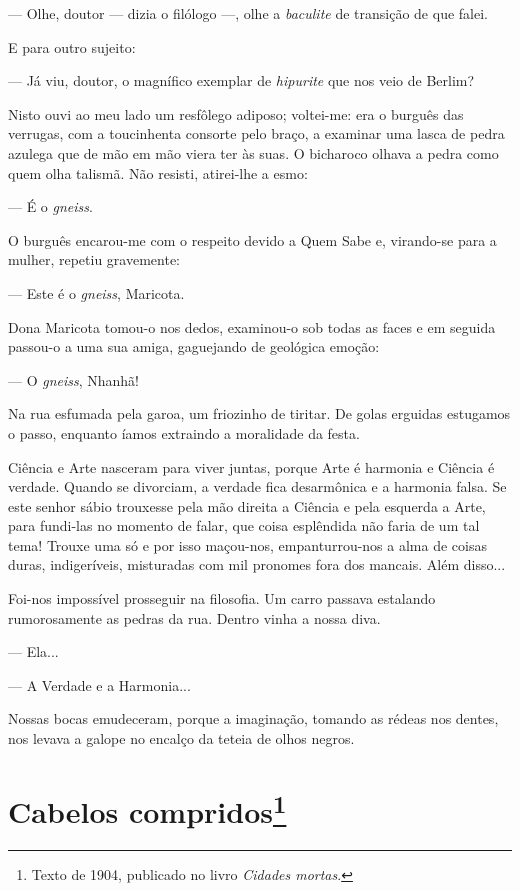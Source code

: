 --- Olhe, doutor --- dizia o filólogo ---, olhe a \emph{baculite} de
transição de que falei.

E para outro sujeito:

--- Já viu, doutor, o magnífico exemplar de \emph{hipurite} que nos veio
de Berlim?

Nisto ouvi ao meu lado um resfôlego adiposo; voltei-me: era o burguês
das verrugas, com a toucinhenta consorte pelo braço, a examinar uma
lasca de pedra azulega que de mão em mão viera ter às suas. O bicharoco
olhava a pedra como quem olha talismã. Não resisti, atirei-lhe a esmo:

--- É o \emph{gneiss}.

O burguês encarou-me com o respeito devido a Quem Sabe e, virando-se
para a mulher, repetiu gravemente:

--- Este é o \emph{gneiss}, Maricota.

Dona Maricota tomou-o nos dedos, examinou-o sob todas as faces e em
seguida passou-o a uma sua amiga, gaguejando de geológica emoção:

--- O \emph{gneiss}, Nhanhã!

Na rua esfumada pela garoa, um friozinho de tiritar. De golas erguidas
estugamos o passo, enquanto íamos extraindo a moralidade da festa.

Ciência e Arte nasceram para viver juntas, porque Arte é harmonia e
Ciência é verdade. Quando se divorciam, a verdade fica desarmônica e a
harmonia falsa. Se este senhor sábio trouxesse pela mão direita a
Ciência e pela esquerda a Arte, para fundi-las no momento de falar, que
coisa esplêndida não faria de um tal tema! Trouxe uma só e por isso
maçou-nos, empanturrou-nos a alma de coisas duras, indigeríveis,
misturadas com mil pronomes fora dos mancais. Além disso...

Foi-nos impossível prosseguir na filosofia. Um carro passava estalando
rumorosamente as pedras da rua. Dentro vinha a nossa diva.

--- Ela...

--- A Verdade e a Harmonia...

Nossas bocas emudeceram, porque a imaginação, tomando as rédeas nos
dentes, nos levava a galope no encalço da teteia de olhos negros.

\chapter{Cabelos compridos\footnote[*]{Texto de 1904, publicado no livro \emph{Cidades mortas}.}}

